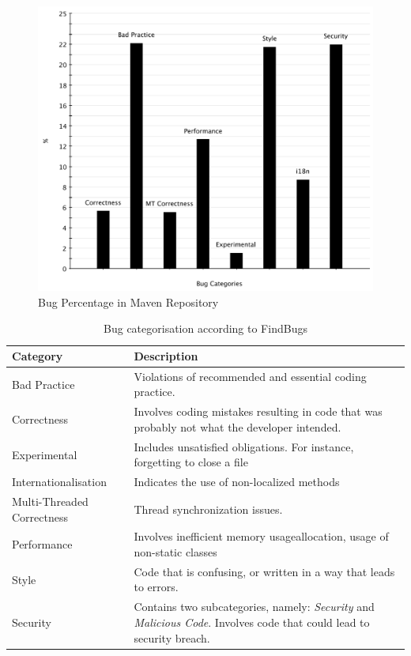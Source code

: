 \documentclass[conference]{IEEEtran}
\begin{document}
\begin{figure}
	\centering
	\includegraphics[scale=0.6]{bug_percent}
	\caption{Bug Percentage in Maven Repository}
	\label{fig:bug-percentage}
\end{figure}

\begin{table}
\centering
\caption{Bug categorisation according to FindBugs}
\label{tbl:bug-categorisation}
\begin{tabular}{l p{15em}}
\hline
Category & Description\\
\hline
Bad Practice & Violations of recommended and essential
coding practice. \\
Correctness & Involves coding mistakes resulting in code
that was probably not what the developer intended. \\
Experimental & Includes unsatisfied obligations. For instance,
forgetting to close a file \\
Internationalisation & Indicates the use of non-localized methods \\
Multi-Threaded Correctness & Thread synchronization issues. \\
Performance & Involves inefficient memory usageallocation, usage 
of non-static classes \\
Style & Code that is confusing, or
written in a way that leads to errors.\\
Security & Contains two subcategories, namely: {\it Security} and {\it
Malicious Code}. Involves code that could lead to security breach. \\
\hline
\end{tabular}
\end{table}
\end{document}
